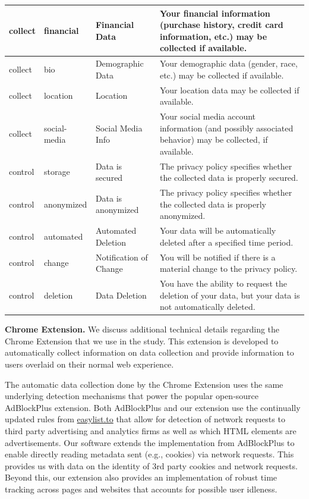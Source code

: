 \documentclass[12pt]{article}
\theoremstyle{definition}
\theoremstyle{remark}
\begin{document}
\begin{appendix}
\begin{table}[H]
{\begin{tabular}{|p{}|p{}|p{}|p{}|}
    \hline
    collect & financial & Financial Data & Your financial information (purchase history, credit card information, etc.) may be collected if available. \\
    \hline
    collect & bio & Demographic Data & Your demographic data (gender, race, etc.) may be collected if available. \\
    \hline
    collect & location & Location & Your location data may be collected if available. \\
    \hline
    collect & social-media & Social Media Info & Your social media account information (and possibly associated behavior) may be collected, if available. \\
    \hline
    control & storage & Data is secured & The privacy policy specifies whether the collected data is properly secured. \\
    \hline
    control & anonymized & Data is anonymized & The privacy policy specifies whether the collected data is properly anonymized. \\
    \hline
    control & automated & Automated Deletion & Your data will be automatically deleted after a specified time period. \\
    \hline
    control & change & Notification of Change & You will be notified if there is a material change to the privacy policy. \\
    \hline
    control & deletion & Data Deletion & You have the ability to request the deletion of your data, but your data is not automatically deleted. \\
    \hline
  \end{tabular}
  }
\end{table}

\noindent \textbf{Chrome Extension.} We discuss additional technical details regarding the Chrome Extension that we use in the study. This extension is developed to automatically collect information on data collection and provide information to users overlaid on their normal web experience.

The automatic data collection done by the Chrome Extension uses the same underlying detection mechanisms that power the popular open-source AdBlockPlus extension. Both AdBlockPlus and our extension use the continually updated rules from \url{easylist.to} that allow for detection of network requests to third party advertising and analytics firms as well as which HTML elements are advertisements. Our software extends the implementation from AdBlockPlus to enable directly reading metadata sent (e.g., cookies) via network requests. This provides us with data on the identity of 3rd party cookies and network requests. Beyond this, our extension also provides an implementation of robust time tracking across pages and websites that accounts for possible user idleness.


\end{appendix}
\end{document}
